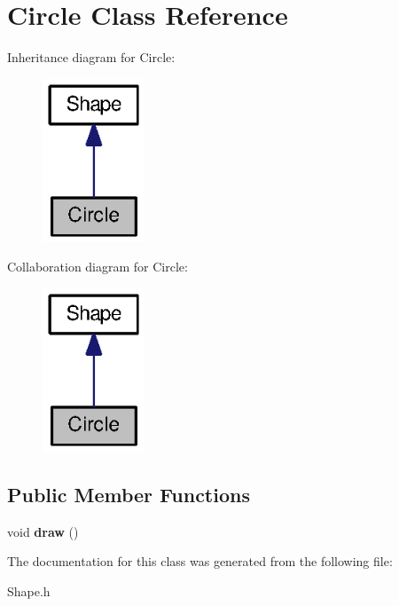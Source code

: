 \section{Circle Class Reference}
\label{class_circle}


Inheritance diagram for Circle\-:
\nopagebreak
\begin{figure}[H]
\begin{center}
\leavevmode
\includegraphics[width=86pt]{class_circle__inherit__graph}
\end{center}
\end{figure}


Collaboration diagram for Circle\-:
\nopagebreak
\begin{figure}[H]
\begin{center}
\leavevmode
\includegraphics[width=86pt]{class_circle__coll__graph}
\end{center}
\end{figure}
\subsection*{Public Member Functions}
\begin{DoxyCompactItemize}
\item 
void {\bfseries draw} ()\label{class_circle_a3a3f7166e7f629e44f9044b0e537eb22}

\end{DoxyCompactItemize}


The documentation for this class was generated from the following file\-:\begin{DoxyCompactItemize}
\item 
Shape.\-h\end{DoxyCompactItemize}
